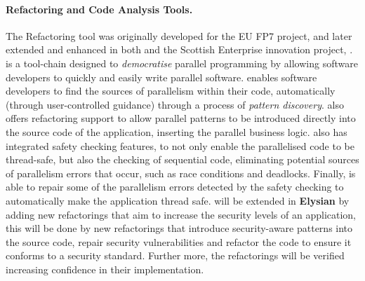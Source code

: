 \documentclass[a4paper,11pt]{article}
\newcommand{\project}[1]{\textbf{#1}\xspace}
\newcommand{\SECURITY}{\project{Elysian}}
\newcommand{\TheProject}{\SECURITY}
\begin{document}
\paragraph{\SAshort{} \paraformance Refactoring and Code Analysis Tools.}


The \paraformance Refactoring tool was originally developed for the EU FP7 \paraphrase{} project, and later extended and enhanced in both \rephrase{} and the Scottish Enterprise innovation project, \paraformance{}. 
\paraformance is a tool-chain designed to \emph{democratise} parallel programming by allowing software developers to quickly and easily write parallel software. \paraformance enables software developers to find the sources of parallelism within their code, automatically (through user-controlled guidance) through a process of \emph{pattern discovery}. \paraformance also offers refactoring support to allow parallel patterns to be introduced directly into the source code of the application, inserting the parallel business logic. \paraformance also has integrated safety checking features, to not only enable  the parallelised code to be thread-safe, but also the checking of sequential code, eliminating potential sources of parallelism errors that occur, such as race conditions and deadlocks. Finally, \paraformance is able to repair some of the parallelism errors detected by the safety checking to automatically make the application thread safe.
\paraformance will be extended in \TheProject{} by adding new refactorings that aim to increase the security levels of an application, this will be done by new refactorings that introduce security-aware patterns into the source code, repair security vulnerabilities and refactor the code to ensure it conforms to a security standard. Further more, the refactorings will be verified increasing confidence in their implementation.
%
\end{document}
